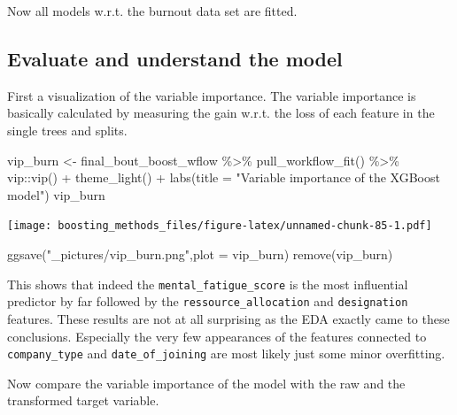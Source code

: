 \documentclass[
]{book}
\newenvironment{Shaded}{\begin{snugshade}}{\end{snugshade}}
\newcommand{\AttributeTok}[1]{\textcolor[rgb]{0.77,0.63,0.00}{#1}}
\newcommand{\FunctionTok}[1]{\textcolor[rgb]{0.00,0.00,0.00}{#1}}
\newcommand{\NormalTok}[1]{#1}
\newcommand{\OtherTok}[1]{\textcolor[rgb]{0.56,0.35,0.01}{#1}}
\newcommand{\SpecialCharTok}[1]{\textcolor[rgb]{0.00,0.00,0.00}{#1}}
\newcommand{\StringTok}[1]{\textcolor[rgb]{0.31,0.60,0.02}{#1}}
\begin{document}
Now all models w.r.t. the burnout data set are fitted.

\hypertarget{evaluate-and-understand-the-model}{%
\subsection{Evaluate and understand the model}\label{evaluate-and-understand-the-model}}

First a visualization of the variable importance. The variable importance is basically calculated by measuring the gain w.r.t. the loss of each feature in the single trees and splits.

\begin{Shaded}
\begin{Highlighting}[]
\NormalTok{vip\_burn }\OtherTok{\textless{}{-}}\NormalTok{ final\_bout\_boost\_wflow }\SpecialCharTok{\%\textgreater{}\%}
  \FunctionTok{pull\_workflow\_fit}\NormalTok{() }\SpecialCharTok{\%\textgreater{}\%}
\NormalTok{  vip}\SpecialCharTok{::}\FunctionTok{vip}\NormalTok{() }\SpecialCharTok{+} 
  \FunctionTok{theme\_light}\NormalTok{() }\SpecialCharTok{+}
  \FunctionTok{labs}\NormalTok{(}\AttributeTok{title =} \StringTok{"Variable importance of the XGBoost model"}\NormalTok{)}
\NormalTok{vip\_burn}
\end{Highlighting}
\end{Shaded}

\texttt{[image: boosting\_methods\_files/figure-latex/unnamed-chunk-85-1.pdf]}

\begin{Shaded}
\begin{Highlighting}[]
\FunctionTok{ggsave}\NormalTok{(}\StringTok{"\_pictures/vip\_burn.png"}\NormalTok{,}\AttributeTok{plot =}\NormalTok{ vip\_burn)}
\FunctionTok{remove}\NormalTok{(vip\_burn)}
\end{Highlighting}
\end{Shaded}

This shows that indeed the \texttt{mental\_fatigue\_score} is the most influential predictor by far followed by the \texttt{ressource\_allocation} and \texttt{designation} features. These results are not at all surprising as the EDA exactly came to these conclusions. Especially the very few appearances of the features connected to \texttt{company\_type} and \texttt{date\_of\_joining} are most likely just some minor overfitting.

Now compare the variable importance of the model with the raw and the transformed target variable.
\end{document}
